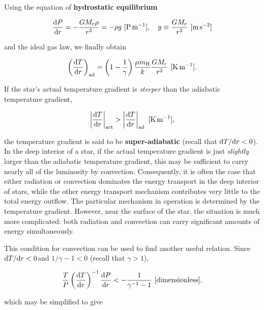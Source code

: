 \documentclass[a4paper,10pt]{article}
\begin{document}
{\noindent}Using the equation of \textbf{hydrostatic equilibrium}

\begin{align*}
    \frac{{\rm d}P}{{\rm d}r} = -\frac{GM_r\rho}{r^2} = -\rho g ~ [{\rm P\,m^{-1}}], ~~~ g \equiv \frac{GM_r}{r^2} ~ [{\rm m\,s^{-2}}]
\end{align*}

{\noindent}and the ideal gas law, we finally obtain

\begin{align*}
    \left(\frac{{\rm d}T}{{\rm d}r}\right)_{\rm ad} = \left(1-\frac{1}{\gamma}\right) \frac{\mu m_{\rm H}}{k}\frac{GM_r}{r^2} ~ [{\rm K\,m^{-1}}].
\end{align*}

{\noindent}If the star's actual temperature gradient is \textit{steeper} than the adiabatic temperature gradient,

\begin{align*}
    \left\lvert\frac{{\rm d}T}{{\rm d}r}\right\rvert_{\rm act} > \left\lvert\frac{{\rm d}T}{{\rm d}r}\right\rvert_{\rm ad} ~ [{\rm K\,m^{-1}}],
\end{align*}

{\noindent}the temperature gradient is said to be \textbf{super-adiabatic} (recall that ${\rm d}T/{\rm d}r<0$). In the deep interior of a star, if the actual temperature gradient is just \textit{slightly} larger than the adiabatic temperature gradient, this may be sufficient to carry nearly all of the luminosity by convection. Consequently, it is often the case that either radiation or convection dominates the energy transport in the deep interior of stars, while the other energy transport mechanism contributes very little to the total energy outflow. The particular mechanism in operation is determined by the temperature gradient. However, near the surface of the star, the situation is much more complicated: both radiation and convection can carry significant amounts of energy simultaneously.

{\noindent}This condition for convection can be used to find another useful relation. Since ${\rm d}T/{\rm d}r<0$and $1/\gamma-1<0$ (recall that $\gamma>1$),

\begin{align*}
    \frac{T}{P}\left(\frac{{\rm d}T}{{\rm d}r}\right)^{-1} \frac{{\rm d}P}{{\rm d}r} < -\frac{1}{\gamma^{-1}-1} ~ [{\rm dimensionless}],
\end{align*}

{\noindent}which may be simplified to give
\end{document}
